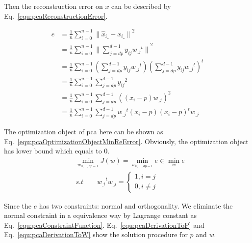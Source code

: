 \documentclass[runningheads,openany]{xhlPaper}
\begin{document}
Then the reconstruction error on $x$ can be described by Eq.~\ref{equ:pcaReconstructionError}. 

\begin{equation}
\label{equ:pcaReconstructionError}
\begin{aligned}
e &= \frac{1}{n}{\sum\limits_{i = 0}^{n - 1} {\parallel {{\hat x}_{i\_}} - {x_{i\_}}\parallel } ^2}\\
 &= \frac{1}{n}{\sum\limits_{i = 0}^{n - 1} {\parallel \sum\limits_{j = {dp}}^{d - 1} {{y_{ij}}{w_{\_j}}^t} \parallel } ^2}\\
 &= \frac{1}{n}\sum\limits_{i = 0}^{n - 1} {\left( {\sum\limits_{j = {dp}}^{d - 1} {{y_{ij}}{w_{\_j}}^t} } \right)} {\left( {\sum\limits_{j = {dp}}^{d - 1} {{y_{ij}}{w_{\_j}}^t} } \right)^t}\\
 &= \frac{1}{n}\sum\limits_{i = 0}^{n - 1} {\sum\limits_{j = {dp}}^{d - 1} {{y_{ij}}^2} } \\
 &= \frac{1}{n}\sum\limits_{i = 0}^{n - 1} {\sum\limits_{j = {dp}}^{d - 1} {{{\left( {\left( {{x_i} - p} \right){w_{\_j}}} \right)}^2}} } \\
 &= \frac{1}{n}\sum\limits_{i = 0}^{n - 1} {\sum\limits_{j = {dp}}^{d - 1} {{w_{\_j}}^t\left( {{x_i} - p} \right){{\left( {{x_i} - p} \right)}^t}{w_{\_j}}} } 
\end{aligned}
\end{equation}

The optimization object of pca here can be shown as Eq.~\ref{equ:pcaOptimizationObjectMinReError}. Obviously, the optimization object has lower bound which equals to 0.
\begin{equation}
\label{equ:pcaOptimizationObjectMinReError}
\begin{aligned}
&\mathop {\min }\limits_{{w_{0,...,{dp} - 1}}} J\left( w \right) = \mathop {\min }\limits_{{w_{0,...,{dp} - 1}}} e \in \mathop {\min }\limits_w e\\
&s.t \quad \quad {w_{\_i}}^t{w_{\_j}} = \left\{ {\begin{array}{*{20}{c}}
{1,i = j}\\
{0,i \ne j}
\end{array}} \right.
\end{aligned}
\end{equation}

Since the $e$ has two constraints: normal and orthogonality. We eliminate the normal constraint in a equivalence way by Lagrange constant as Eq.~\ref{equ:pcaConstraintFunction}. Eq.~\ref{equ:pcaDerivationToP} and Eq.~\ref{equ:pcaDerivationToW} show the solution procedure for $p$ and $w$.
\end{document}
